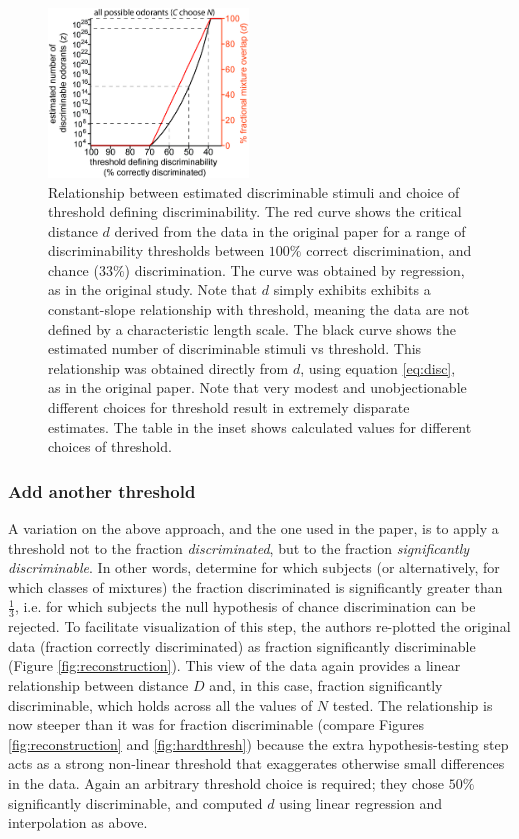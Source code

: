 \documentclass[letterpaper,twocolumn,10pt]{article}
\begin{document}
\begin{figure}
    \centering
    \includegraphics[width=0.475\textwidth]{figures/Fig7_Z_D_vs_threshold}
    \caption{
Relationship between estimated discriminable stimuli and choice of threshold defining discriminability. 
The red curve shows the critical distance $d$ derived from the data in the original paper \cite{bushdid_humans_2014} 
for a range of discriminability thresholds between $100\%$ correct discrimination, 
and chance ($33\%$) discrimination. 
The curve was obtained by regression, as in the original study. 
Note that $d$ simply exhibits exhibits a constant-slope relationship with threshold, 
meaning the data are not defined by a characteristic length scale.
The black curve shows the estimated number of discriminable stimuli vs threshold. 
This relationship was obtained directly from $d$, using equation \ref{eq:disc}, as in the original paper. 
Note that very modest and unobjectionable different choices for threshold result in extremely disparate estimates. 
The table in the inset shows calculated values for different choices of threshold.}
    \label{fig:z_d_threshold}
\end{figure}

\subsubsection{Add another threshold} 
A variation on the above approach, and the one used in the paper, 
is to apply a threshold not to the fraction \textit{discriminated}, 
but to the fraction \textit{significantly discriminable}.  
In other words, determine for which subjects (or alternatively, for which classes of mixtures) the fraction discriminated is significantly greater than $\frac{1}{3}$, 
i.e. for which subjects the null hypothesis of chance discrimination can be rejected.  
To facilitate visualization of this step, the authors re-plotted the original data (fraction correctly discriminated) as fraction significantly discriminable (Figure \ref{fig:reconstruction}).  
This view of the data again provides a linear relationship between distance $D$ and, in this case, fraction significantly discriminable, 
which holds across all the values of $N$ tested.  
The relationship is now steeper than it was for fraction discriminable (compare Figures \ref{fig:reconstruction} and \ref{fig:hardthresh}) 
because the extra hypothesis-testing step acts as a strong non-linear threshold that exaggerates otherwise small differences in the data.  
Again an arbitrary threshold choice is required; they chose $50\%$ significantly discriminable, 
and computed $d$ using linear regression and interpolation as above.  
\end{document}
